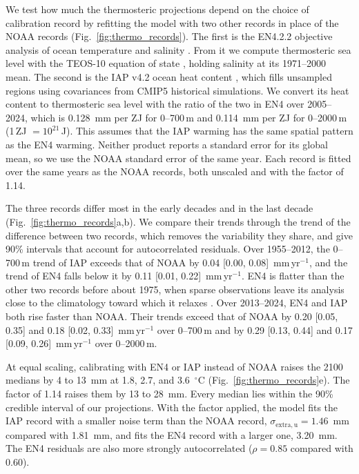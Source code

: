 \documentclass[12pt]{article}
\begin{document}
We test how much the thermosteric projections depend on the choice of calibration record by refitting the model with two other records in place of the NOAA records (Fig.~\ref{fig:thermo_records}). The first is the EN4.2.2 objective analysis of ocean temperature and salinity \citep{Good2013}. From it we compute thermosteric sea level with the TEOS-10 equation of state \citep{IOC2010}, holding salinity at its 1971--2000 mean. The second is the IAP v4.2 ocean heat content \citep{Cheng2017}, which fills unsampled regions using covariances from CMIP5 historical simulations. We convert its heat content to thermosteric sea level with the ratio of the two in EN4 over 2005--2024, which is 0.128~mm per ZJ for 0--700\,m and 0.114~mm per ZJ for 0--2000\,m (1\,ZJ $= 10^{21}$\,J). This assumes that the IAP warming has the same spatial pattern as the EN4 warming. Neither product reports a standard error for its global mean, so we use the NOAA standard error of the same year. Each record is fitted over the same years as the NOAA records, both unscaled and with the factor of 1.14.

The three records differ most in the early decades and in the last decade (Fig.~\ref{fig:thermo_records}a,b). We compare their trends through the trend of the difference between two records, which removes the variability they share, and give 90\% intervals that account for autocorrelated residuals. Over 1955--2012, the 0--700\,m trend of IAP exceeds that of NOAA by 0.04 [0.00, 0.08]~mm\,yr$^{-1}$, and the trend of EN4 falls below it by 0.11 [0.01, 0.22]~mm\,yr$^{-1}$. EN4 is flatter than the other two records before about 1975, when sparse observations leave its analysis close to the climatology toward which it relaxes \citep{Good2013}. Over 2013--2024, EN4 and IAP both rise faster than NOAA. Their trends exceed that of NOAA by 0.20 [0.05, 0.35] and 0.18 [0.02, 0.33]~mm\,yr$^{-1}$ over 0--700\,m and by 0.29 [0.13, 0.44] and 0.17 [0.09, 0.26]~mm\,yr$^{-1}$ over 0--2000\,m.

At equal scaling, calibrating with EN4 or IAP instead of NOAA raises the 2100 medians by 4 to 13~mm at 1.8, 2.7, and 3.6~$^\circ$C (Fig.~\ref{fig:thermo_records}e). The factor of 1.14 raises them by 13 to 28~mm. Every median lies within the 90\% credible interval of our projections. With the factor applied, the model fits the IAP record with a smaller noise term than the NOAA record, $\sigma_{\mathrm{extra,u}} = 1.46$~mm compared with 1.81~mm, and fits the EN4 record with a larger one, 3.20~mm. The EN4 residuals are also more strongly autocorrelated ($\rho = 0.85$ compared with 0.60).
\end{document}
